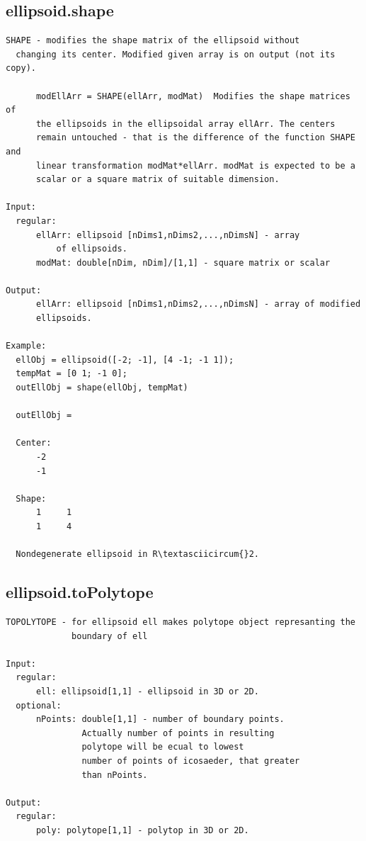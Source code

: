 \documentclass[letterpaper,10pt,english]{sphinxmanual}
\begin{document}
\subsection{ellipsoid.shape}
\label{chap_functions:ellipsoid-shape}
\begin{Verbatim}[commandchars=\\\{\}]
SHAPE - modifies the shape matrix of the ellipsoid without
  changing its center. Modified given array is on output (not its copy).

      modEllArr = SHAPE(ellArr, modMat)  Modifies the shape matrices of
      the ellipsoids in the ellipsoidal array ellArr. The centers
      remain untouched - that is the difference of the function SHAPE and
      linear transformation modMat*ellArr. modMat is expected to be a
      scalar or a square matrix of suitable dimension.

Input:
  regular:
      ellArr: ellipsoid [nDims1,nDims2,...,nDimsN] - array
          of ellipsoids.
      modMat: double[nDim, nDim]/[1,1] - square matrix or scalar

Output:
      ellArr: ellipsoid [nDims1,nDims2,...,nDimsN] - array of modified
      ellipsoids.

Example:
  ellObj = ellipsoid([-2; -1], [4 -1; -1 1]);
  tempMat = [0 1; -1 0];
  outEllObj = shape(ellObj, tempMat)

  outEllObj =

  Center:
      -2
      -1

  Shape:
      1     1
      1     4

  Nondegenerate ellipsoid in R\textasciicircum{}2.
\end{Verbatim}


\subsection{ellipsoid.toPolytope}
\label{chap_functions:ellipsoid-topolytope}
\begin{Verbatim}[commandchars=\\\{\}]
TOPOLYTOPE - for ellipsoid ell makes polytope object represanting the
             boundary of ell

Input:
  regular:
      ell: ellipsoid[1,1] - ellipsoid in 3D or 2D.
  optional:
      nPoints: double[1,1] - number of boundary points.
               Actually number of points in resulting
               polytope will be ecual to lowest
               number of points of icosaeder, that greater
               than nPoints.

Output:
  regular:
      poly: polytope[1,1] - polytop in 3D or 2D.
\end{Verbatim}
\end{document}
